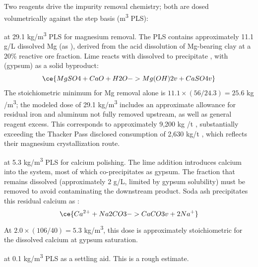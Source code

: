 Two reagents drive the impurity removal chemistry; both are dosed volumetrically against the step basis (m\textsuperscript{3} PLS):

\begin{description}[noitemsep, topsep=0pt]

\item[\textbullet\enskip Lime (\ce{CaO})] at 29.1 kg/m\textsuperscript{3} PLS for magnesium removal. The PLS contains approximately 11.1 g/L dissolved Mg (as ), derived from the acid dissolution of Mg-bearing clay at a 20\% reactive ore fraction. Lime reacts with dissolved  to precipitate , with  (gypsum) as a solid byproduct:
%
\begin{equation*}
  \ce{MgSO4 + CaO + H2O -> Mg(OH)2 v + CaSO4 v}
\end{equation*}
%
The stoichiometric minimum for Mg removal alone is $11.1 \times (56/24.3) = 25.6$ kg /m\textsuperscript{3}; the modeled dose of 29.1 kg/m\textsuperscript{3} includes an approximate allowance for residual iron and aluminum not fully removed upstream, as well as general reagent excess. This corresponds to approximately 9,200 kg /t , substantially exceeding the Thacker Pass disclosed consumption of 2,630 kg/t \cite{sgscanadaincSK1300Technical2024}, which reflects their magnesium crystallization route.

\item[\textbullet\enskip Soda ash (\ce{Na2CO3})] at 5.3 kg/m\textsuperscript{3} PLS for calcium polishing. The lime addition introduces calcium into the system, most of which co-precipitates as gypsum. The fraction that remains dissolved (approximately 2 g/L, limited by gypsum solubility) must be removed to avoid contaminating the downstream  product. Soda ash precipitates this residual calcium as :
\begin{equation*}
  \ce{Ca^{2+} + Na2CO3 -> CaCO3 v + 2Na^+}
\end{equation*}
\alteqend
At $2.0 \times (106/40) = 5.3$ kg/m\textsuperscript{3}, this dose is approximately stoichiometric for the dissolved calcium at gypsum saturation.
 
\item[\textbullet\enskip Flocculant] at 0.1 kg/m\textsuperscript{3} PLS as a settling aid. This is a rough estimate.

\end{description}

